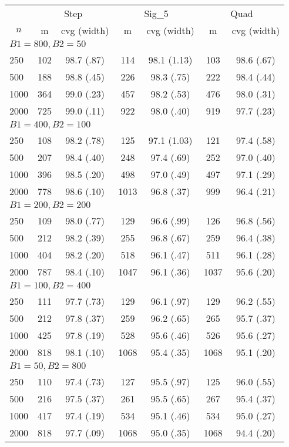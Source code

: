 \begin{tabular}{lcccccc}
   \toprule
 
       & \multicolumn{2}{c}{Step}& \multicolumn{2}{c}{Sig\_5}& \multicolumn{2}{c}{Quad} \\ 
         \cmidrule(l{2pt}r{2pt}){2-3} \cmidrule(l{2pt}r{2pt}){4-5} \cmidrule(l{2pt}r{2pt}){6-7} 
         \multicolumn{1}{c}{$n$} & \multicolumn{1}{c}{m}& \multicolumn{1}{c}{cvg (width)}& \multicolumn{1}{c}{m}& \multicolumn{1}{c}{cvg (width)}& \multicolumn{1}{c}{m}& \multicolumn{1}{c}{cvg (width)} \\  
         \hline   
 \multicolumn{7}{l}{$B1=800, B2=50$} \\ 
250 & 102 & 98.7 (.87) & 114 & 98.1 (1.13) & 103 & 98.6 (.67) \\ 
  500 & 188 & 98.8 (.45) & 226 & 98.3 (.75) & 222 & 98.4 (.44) \\ 
  1000 & 364 & 99.0 (.23) & 457 & 98.2 (.53) & 476 & 98.0 (.31) \\ 
  2000 & 725 & 99.0 (.11) & 922 & 98.0 (.40) & 919 & 97.7 (.23) \\ 
       \hline   
 \multicolumn{7}{l}{$B1=400, B2=100$} \\ 
250 & 108 & 98.2 (.78) & 125 & 97.1 (1.03) & 121 & 97.4 (.58) \\ 
  500 & 207 & 98.4 (.40) & 248 & 97.4 (.69) & 252 & 97.0 (.40) \\ 
  1000 & 396 & 98.5 (.20) & 498 & 97.0 (.49) & 497 & 97.1 (.29) \\ 
  2000 & 778 & 98.6 (.10) & 1013 & 96.8 (.37) & 999 & 96.4 (.21) \\ 
       \hline   
 \multicolumn{7}{l}{$B1=200, B2=200$} \\ 
250 & 109 & 98.0 (.77) & 129 & 96.6 (.99) & 126 & 96.8 (.56) \\ 
  500 & 212 & 98.2 (.39) & 255 & 96.8 (.67) & 259 & 96.4 (.38) \\ 
  1000 & 404 & 98.2 (.20) & 518 & 96.1 (.47) & 511 & 96.1 (.28) \\ 
  2000 & 787 & 98.4 (.10) & 1047 & 96.1 (.36) & 1037 & 95.6 (.20) \\ 
       \hline   
 \multicolumn{7}{l}{$B1=100, B2=400$} \\ 
250 & 111 & 97.7 (.73) & 129 & 96.1 (.97) & 129 & 96.2 (.55) \\ 
  500 & 212 & 97.8 (.37) & 259 & 96.2 (.65) & 265 & 95.7 (.37) \\ 
  1000 & 425 & 97.8 (.19) & 528 & 95.6 (.46) & 526 & 95.6 (.27) \\ 
  2000 & 818 & 98.1 (.10) & 1068 & 95.4 (.35) & 1068 & 95.1 (.20) \\ 
       \hline   
 \multicolumn{7}{l}{$B1=50, B2=800$} \\ 
250 & 110 & 97.4 (.73) & 127 & 95.5 (.97) & 125 & 96.0 (.55) \\ 
  500 & 216 & 97.5 (.37) & 261 & 95.5 (.65) & 267 & 95.4 (.37) \\ 
  1000 & 417 & 97.4 (.19) & 534 & 95.1 (.46) & 534 & 95.0 (.27) \\ 
  2000 & 818 & 97.7 (.09) & 1068 & 95.0 (.35) & 1068 & 94.4 (.20) \\ 
   \hline
\end{tabular}
